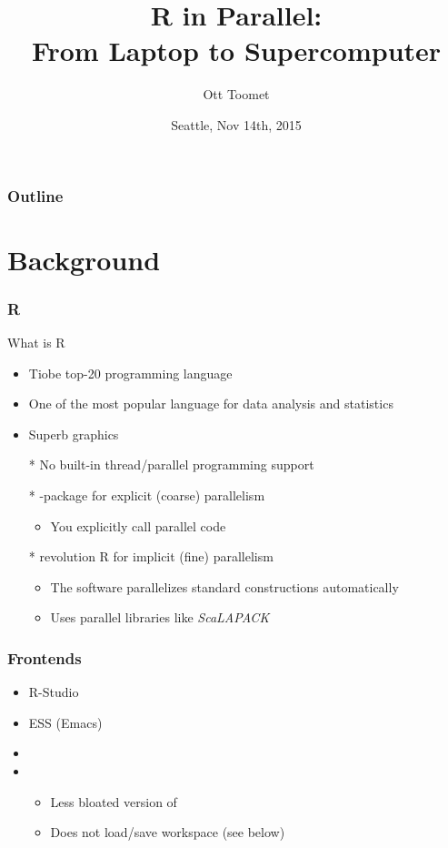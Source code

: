 \documentclass[pdftex]{beamer}
\title[parallel R]{R in Parallel:\\
  From Laptop to Supercomputer}
\author{Ott Toomet}
\date{Seattle, Nov 14th, 2015}
\newcommand{\R}{\textsf{R}\xspace}
\begin{document}
\begin{frame}
  \titlepage
\end{frame}

\begin{frame}
  \frametitle{Outline}
  \tableofcontents
\end{frame}

\section{Background}

\begin{frame}
  \frametitle{\R}
  What is \R
  \begin{itemize}
  \item Tiobe top-20 programming language
  \item One of the most popular language for data analysis and statistics
  \item Superb graphics
    \pause
  \item[*] No built-in thread/parallel programming support
  \item[*] -package for explicit (coarse) parallelism
    \begin{itemize}
    \item You explicitly call parallel code
    \end{itemize}
  \item[*] revolution R for implicit (fine) parallelism
    \begin{itemize}
    \item The software parallelizes standard constructions
      automatically
    \item Uses parallel libraries like \emph{ScaLAPACK}
    \end{itemize}
  \end{itemize}
\end{frame}

\begin{frame}
  \frametitle{Frontends}
  \begin{itemize}
  \item R-Studio
  \item ESS (Emacs)
  \item {}
  \item {}
    \begin{itemize}
    \item Less bloated version of 
    \item Does not load/save workspace (see below)
    \end{itemize}
  \end{itemize}
\end{frame}
\end{document}
